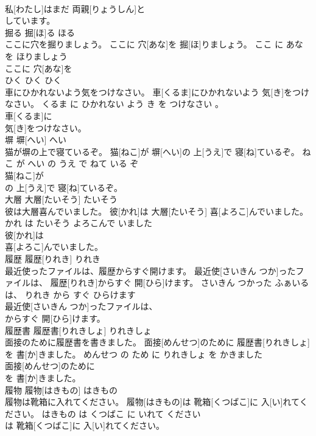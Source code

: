 \documentclass[8pt]{extreport}
\begin{document}
\begin{CJK}{UTF8}{min}
\\	私[わたし]はまだ 両親[りょうしん]と
\\	しています。			
\\	掘る	掘[ほ]る	ほる	
\\	ここに穴を掘りましょう。	ここに 穴[あな]を 掘[ほ]りましょう。	ここ に あな を ほりましょう	
\\	ここに 穴[あな]を
\\	ひく	ひく	ひく	
\\	車にひかれないよう気をつけなさい。	車[くるま]にひかれないよう 気[き]をつけなさい。	くるま に ひかれない よう き を つけなさい 。	
\\	車[くるま]に
\\	気[き]をつけなさい。			
\\	塀	塀[へい]	へい	
\\	猫が塀の上で寝ているぞ。	猫[ねこ]が 塀[へい]の 上[うえ]で 寝[ね]ているぞ。	ねこ が へい の うえ で ねて いる ぞ	
\\	猫[ねこ]が
\\	の 上[うえ]で 寝[ね]ているぞ。			
\\	大層	大層[たいそう]	たいそう	
\\	彼は大層喜んでいました。	彼[かれ]は 大層[たいそう] 喜[よろこ]んでいました。	かれ は たいそう よろこんで いました	
\\	彼[かれ]は
\\	喜[よろこ]んでいました。			
\\	履歴	履歴[りれき]	りれき	
\\	最近使ったファイルは、履歴からすぐ開けます。	最近使[さいきん つか]ったファイルは、 履歴[りれき]からすぐ 開[ひら]けます。	さいきん つかった ふぁいる は、 りれき から すぐ ひらけます	
\\	最近使[さいきん つか]ったファイルは、
\\	からすぐ 開[ひら]けます。			
\\	履歴書	履歴書[りれきしょ]	りれきしょ	
\\	面接のために履歴書を書きました。	面接[めんせつ]のために 履歴書[りれきしょ]を 書[か]きました。	めんせつ の ため に りれきしょ を かきました	
\\	面接[めんせつ]のために
\\	を 書[か]きました。			
\\	履物	履物[はきもの]	はきもの	
\\	履物は靴箱に入れてください。	履物[はきもの]は 靴箱[くつばこ]に 入[い]れてください。	はきもの は くつばこ に いれて ください	
\\	は 靴箱[くつばこ]に 入[い]れてください。			

\end{CJK}
\end{document}

